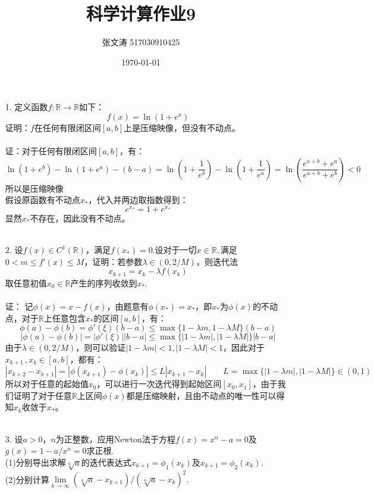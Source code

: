 \documentclass{article}
\title{科学计算作业9}
\author{张文涛 517030910425}
\date{\today}
\begin{document}
	\maketitle
	\begin{itemize}
		\item[1.]定义函数$f:\mathbb{R} \rightarrow \mathbb{R}$如下：
		$$f(x) = \ln(1+e^x)$$
		证明：$f$在任何有限闭区间$[a,b]$上是压缩映像，但没有不动点。\\
		\\
		证：对于任何有限闭区间$[a,b]$，有：
		$$\ln(1+e^b) - \ln(1+e^a) -(b -a) = \ln(1+\frac{1}{e^b}) - \ln(1+\frac{1}{e^a}) = \ln\left(\frac{e^{a+b}+e^a}{e^{a+b} + e^b}\right)<0$$
		所以是压缩映像\\
		假设原函数有不动点$x_{*}$，代入并两边取指数得到：
		$$e^{x_*} = 1 + e^{x_*}$$
		显然$x_*$不存在，因此没有不动点。\\
		\\
		\item[2.]设$f(x)\in C^{1}(\mathbb{R})$，满足$f(x_*) = 0.$设对于一切$x\in \mathbb{R},$满足$0<m\le f'(x)\le M$，证明：若参数$\lambda\in(0,2/M)$，则迭代法
		$$x_{k+1} = x_{k} - \lambda f(x_k)$$
		取任意初值$x_0\in \mathbb{R}$产生的序列收敛到$x_{*}.$\\
		\\
		证：
		记$\phi(x) =  x - f(x)$，由题意有$\phi(x_*) = x_*$，即$x_*$为$\phi(x)$的不动点，对于$\mathbb{R}$上任意包含$x_*$的区间$[a, b]$，有：
		$$\phi(a) - \phi(b) = \phi'(\xi)(b - a) \le \max\{1 - \lambda m, 1 - \lambda M\}(b - a)$$
		$$|\phi(a) - \phi(b) |= |\phi'(\xi)||b - a| \le \max\{|1 - \lambda m|, |1 - \lambda M|\}|b - a|$$
		由于$\lambda \in(0, 2/M)$，则可以验证$|1 - \lambda m|<1, |1 - \lambda M|<1$，因此对于$x_{k+1}\,, x_{k} \in [a, b]$，都有：
		$$|x_{k+2} -  x_{k+1}| = |\phi(x_{k+1}) - \phi(x_k)| \le L|x_{k+1} - x_{k}|\qquad L = \max\{|1 - \lambda m|, |1 - \lambda M|\} \in(0,1)$$
		所以对于任意的起始值$x_0$，可以进行一次迭代得到起始区间$[x_0, x_1]$，由于我们证明了对于任意$\mathbb{R}$上区间$\phi(x)$都是压缩映射，且由不动点的唯一性可以得知$x_k$收敛于$x_*$。\\
		\\
		\item[3.]设$a>0$，$n$为正整数，应用Newton法于方程$f(x) = x^{n} - a = 0$及$g(x) = 1 - a/x^n = 0$求正根.\\
		(1)分别导出求解$\sqrt[n]{a}$的迭代表达式$x_{k+1} = \phi_{1}(x_k)$及$x_{k+1} = \phi_{2}(x_k).$\\
		(2)分别计算$\lim\limits_{k \rightarrow \infty}(\sqrt[n]{a} - x_{k+1})/(\sqrt[n]{a} - x_{k})^2.$\\

\end{itemize}
\end{document}
